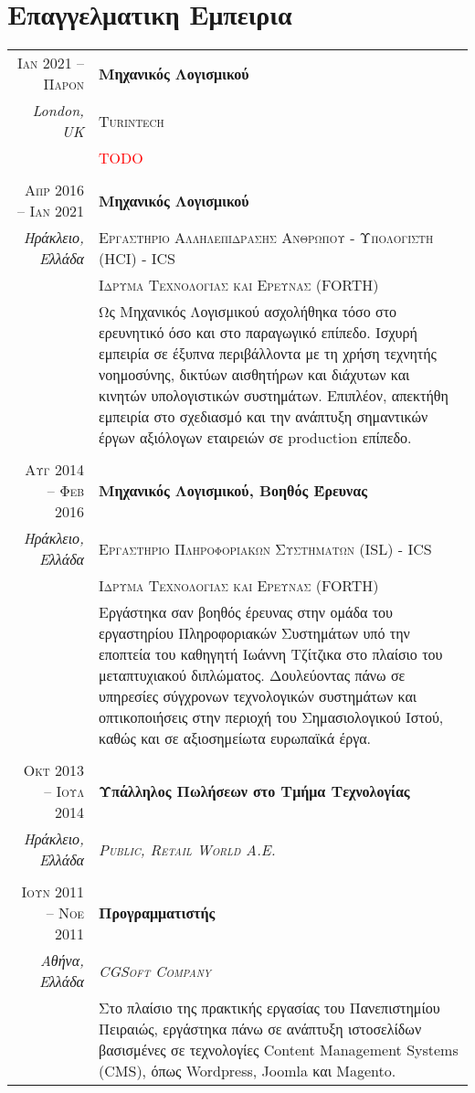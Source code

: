 \documentclass[11pt]{article}
\begin{document}
\section{Επαγγελματικη Εμπειρια}
\begin{longtable}{r|p{12.5cm}}

\textsc{Ιαν 2021 – Παρον} & \textbf{Μηχανικός Λογισμικού} \\
\footnotesize{\textit{London, UK}} &\textsc{Turintech } \\
&\footnotesize{\textcolor{red}{TODO}} \\

\multicolumn{2}{c}{} \\
\textsc{Απρ 2016 – Ιαν 2021} & \textbf{Μηχανικός Λογισμικού} \\
\footnotesize{\textit{Ηράκλειο, Ελλάδα}} &\textsc{Εργαστηριο Αλληλεπιδρασης Ανθρωπου - Υπολογιστη (HCI) - ICS } \\
&\textsc{Ιδρυμα Τεχνολογιας και Ερευνας (FORTH)} \\
&\footnotesize{Ως Μηχανικός Λογισμικού ασχολήθηκα τόσο στο ερευνητικό όσο και στο παραγωγικό επίπεδο. Ισχυρή εμπειρία σε έξυπνα περιβάλλοντα με τη χρήση τεχνητής νοημοσύνης, δικτύων αισθητήρων και διάχυτων και κινητών υπολογιστικών συστημάτων. Επιπλέον, απεκτήθη εμπειρία στο σχεδιασμό και την ανάπτυξη σημαντικών έργων αξιόλογων εταιρειών σε production επίπεδο.}\\

\multicolumn{2}{c}{} \\
\textsc{Αυγ 2014 – Φεβ 2016} & \textbf{Μηχανικός Λογισμικού, Βοηθός Έρευνας} \\
\footnotesize{\textit{Ηράκλειο, Ελλάδα}} &\textsc{Εργαστηριο Πληροφοριακων Συστηματων (ISL) - ICS } \\
&\textsc{Ιδρυμα Τεχνολογιας και Ερευνας (FORTH)} \\
&\footnotesize{Εργάστηκα σαν βοηθός έρευνας στην ομάδα του εργαστηρίου Πληροφοριακών Συστημάτων υπό την εποπτεία του καθηγητή Ιωάννη Τζίτζικα στο πλαίσιο του μεταπτυχιακού διπλώματος. Δουλεύοντας πάνω σε υπηρεσίες σύγχρονων τεχνολογικών συστημάτων και οπτικοποιήσεις στην περιοχή του Σημασιολογικού Ιστού, καθώς και σε αξιοσημείωτα ευρωπαϊκά έργα.}\\

\multicolumn{2}{c}{} \\
\textsc{Οκτ 2013 – Ιουλ 2014} & \textbf{Υπάλληλος Πωλήσεων στο Τμήμα Τεχνολογίας} \\
\footnotesize{\textit{Ηράκλειο, Ελλάδα}} &\emph{\textsc{Public, Retail World A.E.}} \\

\multicolumn{2}{c}{} \\
\textsc{Ιουν 2011 – Νοε 2011} & \textbf{Προγραμματιστής} \\
\footnotesize{\textit{Αθήνα, Ελλάδα}} &\emph{\textsc{CGSoft Company}} \\
&\footnotesize{Στο πλαίσιο της πρακτικής εργασίας του Πανεπιστημίου Πειραιώς, εργάστηκα πάνω σε ανάπτυξη ιστοσελίδων βασισμένες σε τεχνολογίες Content Management Systems (CMS), όπως Wordpress, Joomla και Magento.}\\
\end{longtable}
\end{document}
